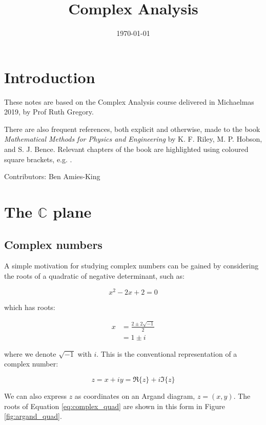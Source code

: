 \documentclass{physics_notes}
\title{Complex Analysis}
\date{\today}
\begin{document}
\maketitle
\tableofcontents
\newpage

\section*{Introduction}

These notes are based on the Complex Analysis course delivered in Michaelmas 2019, by Prof Ruth Gregory. 

There are also frequent references, both explicit and otherwise, made to the book \emph{Mathematical Methods for Physics and Engineering} by K. F. Riley, M. P. Hobson, and S. J. Bence. Relevant chapters of the book are highlighted using coloured square brackets, e.g. .

Contributors: Ben Amies-King

\section{The $\mathbb{C}$ plane}
\subsection{Complex numbers}

A simple motivation for studying complex numbers can be gained by considering the roots of a quadratic of negative determinant, such as:

\begin{equation}\label{eq:complex_quad}
x^2 -2x + 2 = 0
\end{equation}

which has roots:

\begin{align}
x &= \frac{2 \pm 2\sqrt{-1}}{2} \nonumber \\
&= 1 \pm i \nonumber
\end{align}

where we denote $\sqrt{-1}$ with $i$. This is the conventional representation of a complex number:

\begin{equation}
z = x + iy = \Re\{z\} + i\Im\{z\}
\end{equation}

We can also express $z$ as coordinates on an Argand diagram, $z = (x,y)$. The roots of Equation \ref{eq:complex_quad} are shown in this form in Figure \ref{fig:argand_quad}.
\end{document}
